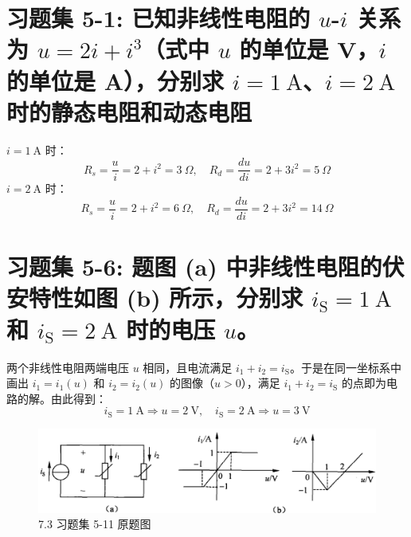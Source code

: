 \documentclass[UTF8]{report}
\theoremstyle{MyLineTheoremStyle} %
\theoremstyle{MyBlockTheoremStyle} %
\theoremstyle{MySubsubsectionStyle} %
\begin{document}
\section{习题集 5-1: 已知非线性电阻的 $u$-$i$ 关系为 $u = 2i + i^3$（式中 $u$ 的单位是 V，$i$ 的单位是 A），分别求 $i = 1 \ \mathrm{A}$、$i = 2 \ \mathrm{A}$ 时的静态电阻和动态电阻}

\noindent $i = 1 \ \mathrm{A}$ 时：
\begin{equation}
R_s = \frac{u}{i} = 2 + i^2 = 3 \ \Omega,\quad R_d = \frac{du}{di} = 2 + 3i^2 = 5 \ \Omega
\end{equation}
$i = 2 \ \mathrm{A}$ 时：
\begin{equation}
R_s = \frac{u}{i} = 2 + i^2 = 6 \ \Omega,\quad R_d = \frac{du}{di} = 2 + 3i^2 = 14 \ \Omega
\end{equation}


\section{习题集 5-6: 题图 (a) 中非线性电阻的伏安特性如图 (b) 所示，分别求 $i_\text{S} = 1 \ \mathrm{A}$ 和 $i_{\text{S}} = 2 \ \mathrm{A}$ 时的电压 $u$。}

两个非线性电阻两端电压 $u$ 相同，且电流满足 $i_1 + i_2 = i_{\text{S}}$。于是在同一坐标系中画出 $i_1 = i_1(u)$ 和 $i_2 = i_2(u)$ 的图像（$u > 0$），满足  $i_1 + i_2 = i_{\text{S}}$ 的点即为电路的解。由此得到：
\begin{equation}
    i_\text{S} = 1 \ \mathrm{A} \Longrightarrow u = 2 \ \mathrm{V},\quad i_\text{S} = 2 \ \mathrm{A} \Longrightarrow u = 3 \ \mathrm{V}
\end{equation}
\begin{figure}[H]\centering
\includegraphics[width=0.8\columnwidth]{assets/7/7.3 习题集 5-11.png}
\caption{7.3 习题集 5-11 原题图}\label{7.3 习题集 5-11}
\end{figure}
\end{document}
